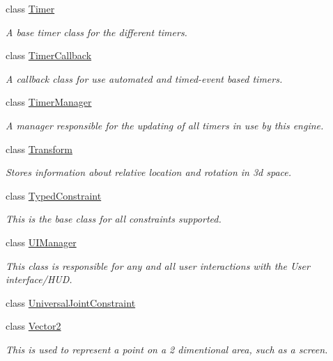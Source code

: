 \begin{DoxyCompactItemize}
class \hyperlink{classMezzanine_1_1Timer}{Timer}
\begin{DoxyCompactList}\small\item\em A base timer class for the different timers. \item\end{DoxyCompactList}\item 
class \hyperlink{classMezzanine_1_1TimerCallback}{TimerCallback}
\begin{DoxyCompactList}\small\item\em A callback class for use automated and timed-\/event based timers. \item\end{DoxyCompactList}\item 
class \hyperlink{classMezzanine_1_1TimerManager}{TimerManager}
\begin{DoxyCompactList}\small\item\em A manager responsible for the updating of all timers in use by this engine. \item\end{DoxyCompactList}\item 
class \hyperlink{classMezzanine_1_1Transform}{Transform}
\begin{DoxyCompactList}\small\item\em Stores information about relative location and rotation in 3d space. \item\end{DoxyCompactList}\item 
class \hyperlink{classMezzanine_1_1TypedConstraint}{TypedConstraint}
\begin{DoxyCompactList}\small\item\em This is the base class for all constraints supported. \item\end{DoxyCompactList}\item 
class \hyperlink{classMezzanine_1_1UIManager}{UIManager}
\begin{DoxyCompactList}\small\item\em This class is responsible for any and all user interactions with the User interface/HUD. \item\end{DoxyCompactList}\item 
class \hyperlink{classMezzanine_1_1UniversalJointConstraint}{UniversalJointConstraint}
\item 
class \hyperlink{classMezzanine_1_1Vector2}{Vector2}
\begin{DoxyCompactList}\small\item\em This is used to represent a point on a 2 dimentional area, such as a screen. \item\end{DoxyCompactList}\item 

\end{DoxyCompactItemize}
